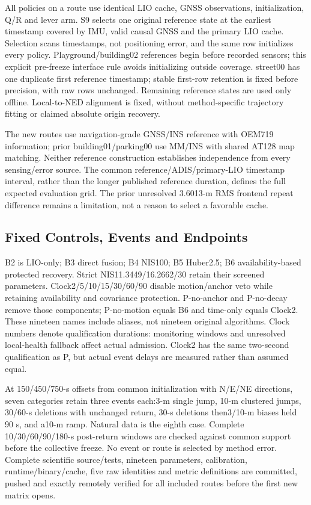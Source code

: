 \documentclass[conference]{IEEEtran}
\begin{document}
All policies on a route use identical LIO cache, GNSS observations, initialization, Q/R and lever arm. S9 selects one original reference state at the earliest timestamp covered by IMU, valid causal GNSS and the primary LIO cache. Selection scans timestamps, not positioning error, and the same row initializes every policy. Playground/building02 references begin before recorded sensors; this explicit pre-freeze interface rule avoids initializing outside coverage. street00 has one duplicate first reference timestamp; stable first-row retention is fixed before precision, with raw rows unchanged. Remaining reference states are used only offline. Local-to-NED alignment is fixed, without method-specific trajectory fitting or claimed absolute origin recovery.

The new routes use navigation-grade GNSS/INS reference with OEM719 information; prior building01/parking00 use MM/INS with shared AT128 map matching. Neither reference construction establishes independence from every sensing/error source. The common reference/ADIS/primary-LIO timestamp interval, rather than the longer published reference duration, defines the full expected evaluation grid. The prior unresolved 3.6013-m RMS frontend repeat difference remains a limitation, not a reason to select a favorable cache.

\subsection{Fixed Controls, Events and Endpoints}
B2 is LIO-only; B3 direct fusion; B4 NIS100; B5 Huber2.5; B6 availability-based protected recovery. Strict NIS11.3449/16.2662/30 retain their screened parameters. Clock2/5/10/15/30/60/90 disable motion/anchor veto while retaining availability and covariance protection. P-no-anchor and P-no-decay remove those components; P-no-motion equals B6 and time-only equals Clock2. These nineteen names include aliases, not nineteen original algorithms. Clock numbers denote qualification durations: monitoring windows and unresolved local-health fallback affect actual admission. Clock2 has the same two-second qualification as P, but actual event delays are measured rather than assumed equal.

At 150/450/750-s offsets from common initialization with N/E/NE directions, seven categories retain three events each:3-m single jump, 10-m clustered jumps, 30/60-s deletions with unchanged return, 30-s deletions then3/10-m biases held 90 s, and a10-m ramp. Natural data is the eighth case. Complete 10/30/60/90/180-s post-return windows are checked against common support before the collective freeze. No event or route is selected by method error. Complete scientific source/tests, nineteen parameters, calibration, runtime/binary/cache, five raw identities and metric definitions are committed, pushed and exactly remotely verified for all included routes before the first new matrix opens.
\end{document}
